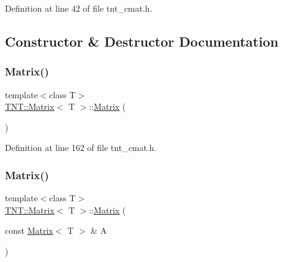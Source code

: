 Definition at line 42 of file tnt\+\_\+cmat.\+h.



\subsection{Constructor \& Destructor Documentation}
\mbox{\label{classTNT_1_1Matrix_a38e705abbbd5155756241db959bae662}} 
\subsubsection{\texorpdfstring{Matrix()}{Matrix()}\hspace{0.1cm}{\footnotesize\ttfamily [1/5]}}
{\footnotesize\ttfamily template$<$class T$>$ \\
\hyperlink{classTNT_1_1Matrix}{T\+N\+T\+::\+Matrix}$<$ T $>$\+::\hyperlink{classTNT_1_1Matrix}{Matrix} (\begin{DoxyParamCaption}{ }\end{DoxyParamCaption})\hspace{0.3cm}{\ttfamily [inline]}}



Definition at line 162 of file tnt\+\_\+cmat.\+h.

\mbox{\label{classTNT_1_1Matrix_aa6cd1bfe3ede4545d0e6693a443b50f1}} 
\subsubsection{\texorpdfstring{Matrix()}{Matrix()}\hspace{0.1cm}{\footnotesize\ttfamily [2/5]}}
{\footnotesize\ttfamily template$<$class T$>$ \\
\hyperlink{classTNT_1_1Matrix}{T\+N\+T\+::\+Matrix}$<$ T $>$\+::\hyperlink{classTNT_1_1Matrix}{Matrix} (\begin{DoxyParamCaption}\item[{const \hyperlink{classTNT_1_1Matrix}{Matrix}$<$ T $>$ \&}]{A }\end{DoxyParamCaption})\hspace{0.3cm}{\ttfamily [inline]}}



